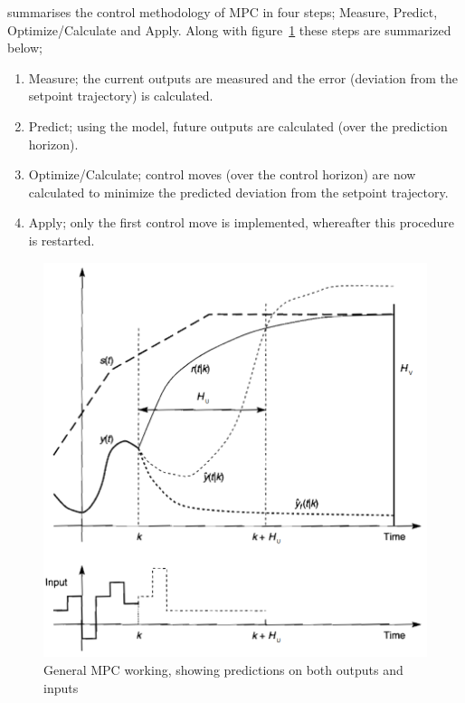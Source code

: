 \citet[8]{maciejowskimpc} summarises the control methodology of MPC in four 
steps; Measure, Predict, Optimize/Calculate and Apply. Along with 
figure~\ref{fig:mpc:general} these steps are summarized below;
\begin{enumerate}
  \item Measure; the current outputs are measured and the error (deviation from
    the setpoint trajectory) is calculated.
  \item Predict; using the model, future outputs are calculated (over the 
    prediction horizon).
  \item Optimize/Calculate; control moves (over the control horizon) are now
    calculated to minimize the predicted deviation from the setpoint trajectory.
  \item Apply; only the first control move is implemented, whereafter this 
    procedure is restarted.
\end{enumerate}
\begin{figure}[htbp]
  \centering
  \includegraphics[width=\fullwidth]{graph/mpc_general}
  \caption[General MPC working]{General MPC working, showing predictions on both outputs and inputs}
  \label{fig:mpc:general}
\end{figure}

